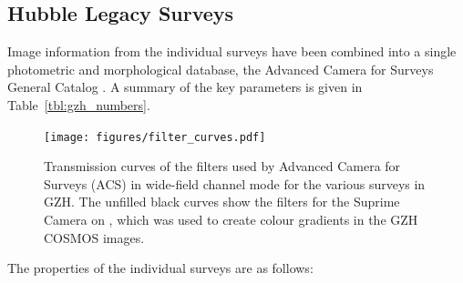 \documentclass[a4paper,fleqn,usenatbib]{mnras}
\begin{document}
\subsection{Hubble Legacy Surveys}\label{ssec:legacy_surveys}

Image information from
the individual surveys have been combined into a single photometric and
morphological database, the Advanced Camera for Surveys General Catalog
\citep[ACS-GC;][]{gri12}. A summary of the key parameters is given in
Table~\ref{tbl:gzh_numbers}. 


\begin{figure}
\texttt{[image: figures/filter\_curves.pdf]}
\caption{Transmission curves of the filters used by \hst{} Advanced Camera for
Surveys (ACS) in wide-field channel mode for the various surveys in GZH. The
unfilled black curves show the filters for the Suprime Camera on \subaru, which
was used to create colour gradients in the GZH COSMOS
images.}
\label{fig:filtercurves}
\end{figure}

The properties of the individual surveys are as follows:
\end{document}
